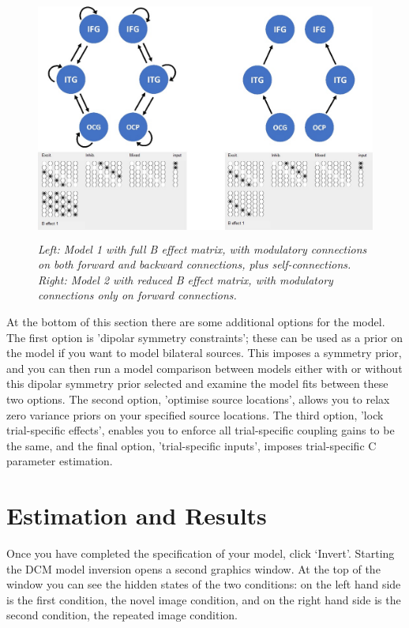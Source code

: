 \begin{figure}
\begin{center}
\includegraphics[width=4.73175in,height=3.15694in]{dcm_erp/figures/B_matrix.png}
\caption{\em Left: Model 1 with full B effect matrix, with modulatory
connections on both forward and backward connections, plus
self-connections. Right: Model 2 with reduced B effect matrix, with
modulatory connections only on forward connections.\label{dcm-erp:fig:4}}
\end{center}
\end{figure}

At the bottom of this section there are some additional options for the
model. The first option is 'dipolar symmetry constraints'; these can be
used as a prior on the model if you want to model bilateral sources.
This imposes a symmetry prior, and you can then run a model comparison
between models either with or without this dipolar symmetry prior
selected and examine the model fits between these two options. The
second option, 'optimise source locations', allows you to relax zero
variance priors on your specified source locations. The third option,
'lock trial-specific effects', enables you to enforce all trial-specific
coupling gains to be the same, and the final option, 'trial-specific
inputs', imposes trial-specific C parameter estimation.

\section{Estimation and Results}

Once you have completed the specification of your model, click `Invert'.
Starting the DCM model inversion opens a second graphics window. At the
top of the window you can see the hidden states of the two conditions:
on the left hand side is the first condition, the novel image condition,
and on the right hand side is the second condition, the repeated image
condition.

